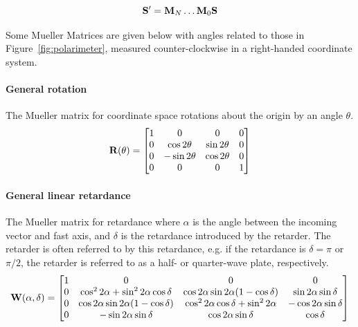 \begin{equation}
    \mathbf{S}^{\prime} = \mathbf{M}_{N} \dots \mathbf{M}_{0} \mathbf{S}
    \label{eq:mueller_train}
\end{equation}

Some Mueller Matrices are given below with angles related to those in Figure~\ref{fig:polarimeter}, measured counter-clockwise in a right-handed coordinate system.

\paragraph*{General rotation}
The Mueller matrix for coordinate space rotations about the origin by an angle $\theta$.
\begin{equation}
    \mathbf{R}(\theta) =
    \begin{bmatrix}
        1 & 0              & 0             & 0 \\
        0 & \cos 2 \theta  & \sin 2 \theta & 0 \\
        0 & -\sin 2 \theta & \cos 2 \theta & 0 \\
        0 & 0              & 0             & 1 \\
    \end{bmatrix}
    \label{matrix:rotate}
\end{equation}

\paragraph*{General linear retardance}
The Mueller matrix for retardance where $\alpha$ is the angle between the incoming vector and fast axis, and $\delta$ is the retardance introduced by the retarder. The retarder is often referred to by this retardance, e.g. if the retardance is $\delta = \pi$ or $\pi / 2$, the retarder is referred to as a half- or quarter-wave plate, respectively.
\begin{equation}
    \mathbf{W}(\alpha, \delta) =
    \begin{bmatrix}
        1 & 0                                                 & 0                                                 & 0                          \\
        0 & \cos^{2} 2 \alpha + \sin^{2} 2 \alpha \cos \delta & \cos 2 \alpha \sin 2 \alpha  (1 - \cos \delta)    & \sin 2 \alpha \sin \delta  \\
        0 & \cos 2 \alpha \sin 2 \alpha  (1 - \cos \delta)    & \cos^{2} 2 \alpha \cos \delta + \sin^{2} 2 \alpha & -\cos 2 \alpha \sin \delta \\
        0 & -\sin 2 \alpha \sin \delta                        & \cos 2 \alpha \sin \delta                         & \cos \delta                \\
    \end{bmatrix}
    \label{matrix:retarder}
\end{equation}

